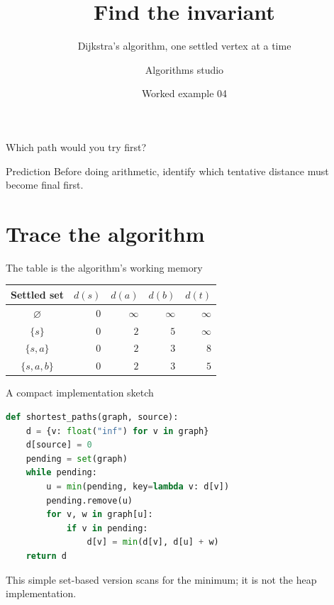 \documentclass[11pt,aspectratio=43]{beamer}
\title[Shortest paths]{Find the invariant}
\subtitle{Dijkstra's algorithm, one settled vertex at a time}
\author{Algorithms studio}
\date{Worked example 04}
\begin{document}
\begin{frame}[plain]\titlepage\end{frame}
\begin{frame}{Which path would you try first?}
\centering
{}
\medskip
\begin{block}{Prediction}
Before doing arithmetic, identify which tentative distance must become final first.
\end{block}
\end{frame}
\section{Trace the algorithm}
\begin{frame}{The table is the algorithm's working memory}
\begin{center}\begin{tabular}{c|rrrr}
Settled set & $d(s)$ & $d(a)$ & $d(b)$ & $d(t)$\\\hline
$\varnothing$ & $0$ & $\infty$ & $\infty$ & $\infty$\\
$\{s\}$ & $0$ & $2$ & $5$ & $\infty$\\
$\{s,a\}$ & $0$ & $2$ & $3$ & $8$\\
$\{s,a,b\}$ & $0$ & $2$ & $3$ & $5$
\end{tabular}\end{center}
\end{frame}
\begin{frame}[fragile]{A compact implementation sketch}
\begin{lstlisting}[language=Python]
def shortest_paths(graph, source):
    d = {v: float("inf") for v in graph}
    d[source] = 0
    pending = set(graph)
    while pending:
        u = min(pending, key=lambda v: d[v])
        pending.remove(u)
        for v, w in graph[u]:
            if v in pending:
                d[v] = min(d[v], d[u] + w)
    return d
\end{lstlisting}
\small This simple set-based version scans for the minimum; it is not the heap implementation.
\end{frame}
\end{document}
